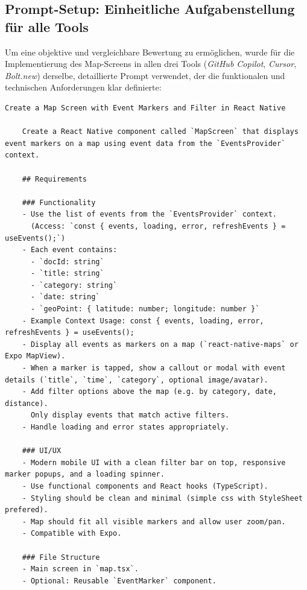 
\subsection{Prompt-Setup: Einheitliche Aufgabenstellung für alle Tools}
\label{sec:prompt-setup}

Um eine objektive und vergleichbare Bewertung zu ermöglichen, wurde für die
Implementierung des Map-Screens in allen drei Tools (\textit{GitHub Copilot},
\textit{Cursor}, \textit{Bolt.new}) derselbe, detaillierte Prompt verwendet,
der die funktionalen und technischen Anforderungen klar definierte:

\begin{lstlisting}[]
    Create a Map Screen with Event Markers and Filter in React Native
    
    Create a React Native component called `MapScreen` that displays event markers on a map using event data from the `EventsProvider` context.
    
    ## Requirements
    
    ### Functionality
    - Use the list of events from the `EventsProvider` context.  
      (Access: `const { events, loading, error, refreshEvents } = useEvents();`)
    - Each event contains:
      - `docId: string`
      - `title: string`
      - `category: string`
      - `date: string`
      - `geoPoint: { latitude: number; longitude: number }`
    - Example Context Usage: const { events, loading, error, refreshEvents } = useEvents();
    - Display all events as markers on a map (`react-native-maps` or Expo MapView).
    - When a marker is tapped, show a callout or modal with event details (`title`, `time`, `category`, optional image/avatar).
    - Add filter options above the map (e.g. by category, date, distance).  
      Only display events that match active filters.
    - Handle loading and error states appropriately.
    
    ### UI/UX
    - Modern mobile UI with a clean filter bar on top, responsive marker popups, and a loading spinner.
    - Use functional components and React hooks (TypeScript).
    - Styling should be clean and minimal (simple css with StyleSheet prefered).
    - Map should fit all visible markers and allow user zoom/pan.
    - Compatible with Expo.
    
    ### File Structure
    - Main screen in `map.tsx`.
    - Optional: Reusable `EventMarker` component.
    

\end{lstlisting}
